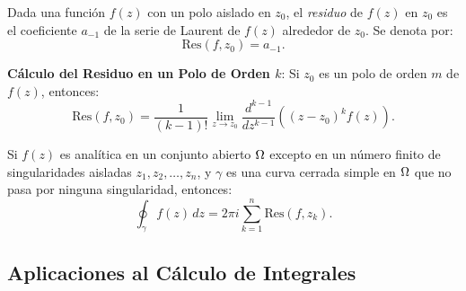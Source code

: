 \documentclass[main.tex]{subfiles}
\begin{document}
\begin{def.}[Residuo]
Dada una función \(f(z)\) con un polo aislado en \(z_0\), el \emph{residuo} de \(f(z)\) en \(z_0\) es el coeficiente \(a_{-1}\) de la serie de Laurent de \(f(z)\) alrededor de \(z_0\). Se denota por:
\[
\text{Res}(f, z_0) = a_{-1}.
\]
\end{def.}
\noindent\textbf{Cálculo del Residuo en un Polo de Orden \(k\)}:
Si \(z_0\) es un polo de orden \(m\) de \(f(z)\), entonces:
\[
\text{Res}(f, z_0) = \frac{1}{(k-1)!} \lim_{z \to z_0} \frac{d^{k-1}}{dz^{k-1}} \left( (z - z_0)^k f(z) \right).
\]

\begin{teorema}
Si \(f(z)\) es analítica en un conjunto abierto \(\Omega\) excepto en un número finito de singularidades aisladas \(z_1, z_2, \dots, z_n\), y \(\gamma\) es una curva cerrada simple en \(\Omega\) que no pasa por ninguna singularidad, entonces:
\[
\oint_\gamma f(z) \, dz = 2\pi i \sum_{k=1}^n \text{Res}(f, z_k).
\]
\end{teorema}

\subsection{Aplicaciones al Cálculo de Integrales}
\end{document}
